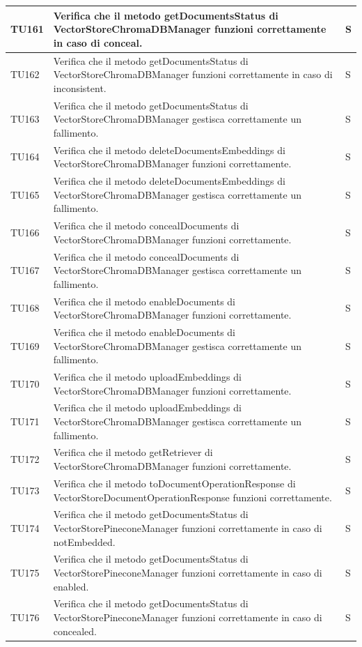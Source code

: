 \documentclass[10pt, a4paper]{article}
\begin{document}
\begin{xltabular}{\textwidth}{p{0.12\textwidth}|p{0.7\textwidth}|X}
\hline
TU161 & Verifica che il metodo getDocumentsStatus di VectorStoreChromaDBManager funzioni correttamente in caso di conceal. & S \\
\hline
TU162 & Verifica che il metodo getDocumentsStatus di VectorStoreChromaDBManager funzioni correttamente in caso di inconsistent. & S \\
\hline
TU163 & Verifica che il metodo getDocumentsStatus di VectorStoreChromaDBManager gestisca correttamente un fallimento. & S \\
\hline
TU164 & Verifica che il metodo deleteDocumentsEmbeddings di VectorStoreChromaDBManager funzioni correttamente. & S \\
\hline
TU165 & Verifica che il metodo deleteDocumentsEmbeddings di VectorStoreChromaDBManager gestisca correttamente un fallimento. & S \\
\hline
TU166 & Verifica che il metodo concealDocuments di VectorStoreChromaDBManager funzioni correttamente. & S \\
\hline
TU167 & Verifica che il metodo concealDocuments di VectorStoreChromaDBManager gestisca correttamente un fallimento. & S \\
\hline
TU168 & Verifica che il metodo enableDocuments di VectorStoreChromaDBManager funzioni correttamente. & S \\
\hline
TU169 & Verifica che il metodo enableDocuments di VectorStoreChromaDBManager gestisca correttamente un fallimento. & S \\
\hline
TU170 & Verifica che il metodo uploadEmbeddings di VectorStoreChromaDBManager funzioni correttamente. & S \\
\hline
TU171 & Verifica che il metodo uploadEmbeddings di VectorStoreChromaDBManager gestisca correttamente un fallimento. & S \\
\hline
TU172 & Verifica che il metodo getRetriever di VectorStoreChromaDBManager funzioni correttamente. & S \\
\hline
TU173 & Verifica che il metodo toDocumentOperationResponse di VectorStoreDocumentOperationResponse funzioni correttamente. & S \\
\hline
TU174 & Verifica che il metodo getDocumentsStatus di VectorStorePineconeManager funzioni correttamente in caso di notEmbedded. & S \\
\hline
TU175 & Verifica che il metodo getDocumentsStatus di VectorStorePineconeManager funzioni correttamente in caso di enabled. & S \\
\hline
TU176 & Verifica che il metodo getDocumentsStatus di VectorStorePineconeManager funzioni correttamente in caso di concealed. & S \\

\end{xltabular}
\end{document}
